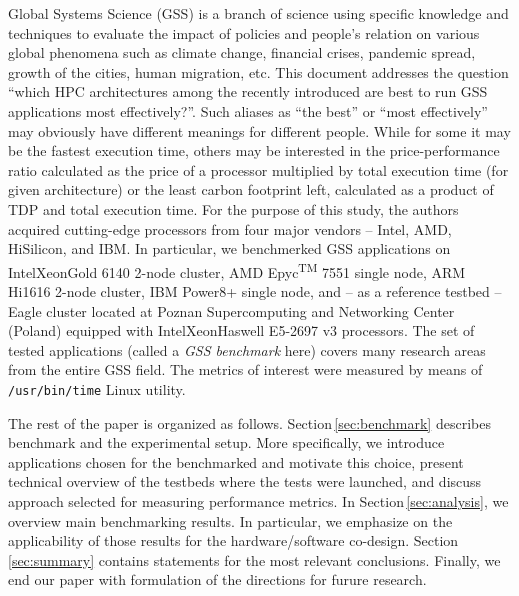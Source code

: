Global Systems Science (GSS) is a branch of science using specific knowledge and techniques to evaluate the impact of policies and people's relation on various global phenomena such as climate change, financial crises, pandemic spread, growth of the cities, human migration, etc. This document addresses the question ``which HPC architectures among the recently introduced are best to run GSS applications most effectively?''. Such aliases as ``the best'' or ``most effectively'' may obviously have different meanings for different people. While for some it may be the fastest execution time, others may be interested in the price-performance ratio calculated as the price of a processor multiplied by total execution time (for given architecture) or the least carbon footprint left, calculated as a product of TDP and total execution time.
For the purpose of this study, the authors acquired cutting-edge processors from four major vendors -- Intel, AMD, HiSilicon, and IBM. In particular, we benchmerked GSS applications on Intel\textregistered Xeon\textregistered Gold 6140 \cite{INTELXEONGOLD6140} 2-node cluster, AMD Epyc\textsuperscript{TM} 7551 single node, ARM Hi1616 2-node cluster, IBM Power8+ \cite{IBMPOWER8} single node, and -- as a reference testbed -- Eagle cluster located at Poznan Supercomputing and Networking Center (Poland) equipped with Intel\textregistered  Xeon\textregistered Haswell E5-2697 v3 processors.
The set of tested applications (called a \textit{GSS benchmark} here) covers many research areas from the entire GSS field.
The metrics of interest were measured by means of \texttt{/usr/bin/time} Linux utility.

The rest of the paper is organized as follows.
Section\,\ref{sec:benchmark} describes benchmark and the experimental setup.
More specifically, we introduce applications chosen for the benchmarked and motivate this choice,
present technical overview of the testbeds where the tests were launched,
and discuss approach selected for measuring performance metrics.
In Section\,\ref{sec:analysis}, we overview main benchmarking results.
In particular, we emphasize on the applicability of those results for the hardware/software co-design.
Section\,\ref{sec:summary} contains statements for the most relevant conclusions.
Finally, we end our paper with formulation of the directions for furure research.
